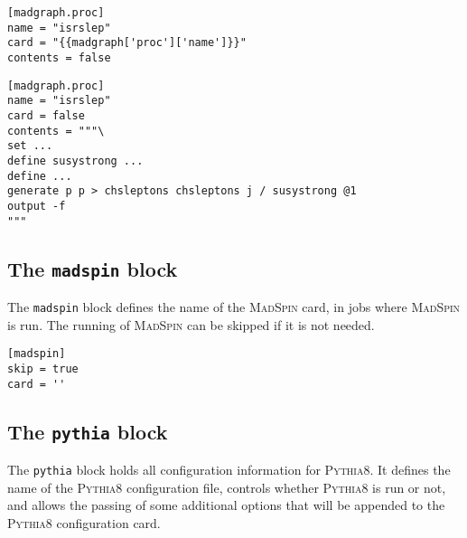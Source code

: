 \documentclass{article}
\newcommand{\madspin}{\textsc{MadSpin}}
\newcommand{\pythia}{\textsc{Pythia8}}
\newcommand{\toml}{\textsc{toml}}
\begin{document}
\begin{listing}[H]
	\begin{verbatim}
[madgraph.proc]
name = "isrslep"
card = "{{madgraph['proc']['name']}}"
contents = false
  \end{verbatim}
	\caption{The \texttt{madgraph.proc} block of an example full \toml{} configuration file for generating slepton events.}
	\label{slepton-config-proc}
\end{listing}

\begin{listing}[H]
	\begin{verbatim}
[madgraph.proc]
name = "isrslep"
card = false
contents = """\
set ...
define susystrong ...
define ...
generate p p > chsleptons chsleptons j / susystrong @1
output -f
"""
  \end{verbatim}
	\caption{The \texttt{madgraph.proc} block demonstrating how to create a process card on-the-fly using \texttt{contents} to generate slepton events.}
	\label{slepton-config-proc-contents}
\end{listing}

\subsection{The \texttt{madspin} block}
\label{ssec:the-madspin-block}

The \texttt{madspin} block defines the name of the \madspin{} card, in jobs where \madspin{} is run.  The running of \madspin{} can be skipped if it is not needed.

\begin{listing}[H]
	\begin{verbatim}
[madspin]
skip = true
card = ''
        \end{verbatim}
	\caption{The \texttt{madgraph.run} block of an example \toml{} configuration file for generating slepton events.}
	\label{slepton-config-madpsin}
\end{listing}

\subsection{The \texttt{pythia} block}
\label{ssec:the-pythia-block}

The \texttt{pythia} block holds all configuration information for \pythia.  It defines the name of the \pythia{} configuration file, controls whether \pythia{} is run or not, and allows the passing of some additional options that will be appended to the \pythia{} configuration card.
\end{document}
